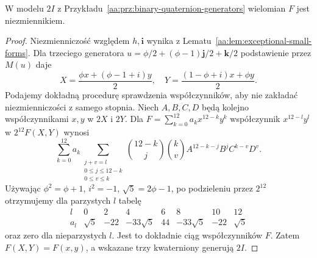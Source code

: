 \begin{lemat}
\label{aa:lem:exceptional-icosahedral-form}
W modelu $2I$ z Przykładu~\ref{aa:prz:binary-quaternion-generators}
wielomian $F$ jest niezmiennikiem.
\end{lemat}
\begin{proof}
Niezmienniczość względem $h,\mathbf i$ wynika
z Lematu~\ref{aa:lem:exceptional-small-forms}.
Dla trzeciego generatora
$u=\phi/2+(\phi-1)\mathbf j/2+\mathbf k/2$
podstawienie przez $M(u)$ daje
\[
 X=\frac{\phi x+(\phi-1+i)y}{2},\quad
 Y=\frac{(1-\phi+i)x+\phi y}{2}.
\]
Podajemy dokładną procedurę sprawdzenia współczynników,
aby nie zakładać niezmienniczości z samego stopnia.
Niech $A,B,C,D$ będą kolejno współczynnikami
$x,y$ w $2X$ i $2Y$. Dla
$F=\sum_{k=0}^{12}a_kx^{12-k}y^k$ współczynnik
$x^{12-l}y^l$ w $2^{12}F(X,Y)$ wynosi
\[
 \sum_{k=0}^{12}a_k
 \sum_{\substack{j+v=l\\0\le j\le12-k\\0\le v\le k}}
 \binom{12-k}{j}\binom{k}{v}
 A^{12-k-j}B^jC^{k-v}D^v.
\]
Używając $\phi^2=\phi+1$, $i^2=-1$,
$\sqrt5=2\phi-1$, po podzieleniu przez $2^{12}$
otrzymujemy dla parzystych $l$ tabelę
\[
\begin{array}{c|rrrrrrr}
l&0&2&4&6&8&10&12\\ \hline
a_l&\sqrt5&-22&-33\sqrt5&44&-33\sqrt5&-22&\sqrt5
\end{array}
\]
oraz zero dla nieparzystych $l$.
Jest to dokładnie ciąg współczynników $F$.
Zatem $F(X,Y)=F(x,y)$, a wskazane trzy
kwaterniony generują $2I$.
\end{proof}

